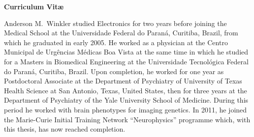 \cleardoublepage
{}
\vspace*{\fill}
\begin{center}
\begin{Large}
\textbf{Curriculum Vit\ae{}}
\end{Large}
\end{center}

\noindent
Anderson M.\ Winkler studied Electronics for two years before joining the Medical School at the Universidade Federal do Paran\'{a}, Curitiba, Brazil, from which he graduated in early 2005. He worked as a physician at the Centro Municipal de Urg\^{e}ncias M\'{e}dicas Boa Vista at the same time in which he studied for a Masters in Biomedical Engineering at the Universidade Tecnol\'{o}gica Federal do Paran\'{a}, Curitiba, Brazil. Upon completion, he worked for one year as Postdoctoral Associate at the Department of Psychiatry of University of Texas Health Science at San Antonio, Texas, United States, then for three years at the Department of Psychiatry of the Yale University School of Medicine. During this period he worked with brain phenotypes for imaging genetics. In 2011, he joined the Marie-Curie Initial Training Network ``Neurophysics'' programme which, with this thesis, has now reached completion.

\vspace*{\fill}

\cleardoublepage
